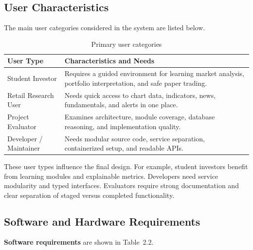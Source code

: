 \documentclass[12pt,a4paper]{report}
\begin{document}
\subsection{User Characteristics}
The main user categories considered in the system are listed below.

\begin{table}[H]
\centering
\caption{Primary user categories}
\begin{tabularx}{\textwidth}{>{\raggedright\arraybackslash}p{1.7in} X}
\toprule
\textbf{User Type} & \textbf{Characteristics and Needs} \\
\midrule
Student Investor & Requires a guided environment for learning market analysis, portfolio interpretation, and safe paper trading. \\
Retail Research User & Needs quick access to chart data, indicators, news, fundamentals, and alerts in one place. \\
Project Evaluator & Examines architecture, module coverage, database reasoning, and implementation quality. \\
Developer / Maintainer & Needs modular source code, service separation, containerized setup, and readable APIs. \\
\bottomrule
\end{tabularx}
\end{table}

These user types influence the final design. For example, student investors benefit from learning modules and explainable metrics. Developers need service modularity and typed interfaces. Evaluators require strong documentation and clear separation of staged versus completed functionality.

\subsection{Software and Hardware Requirements}
\textbf{Software requirements} are shown in Table~2.2.
\end{document}
